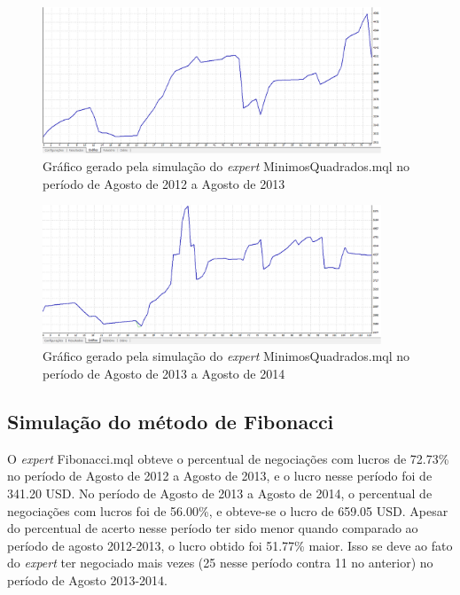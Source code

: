 \begin{figure}[H]
\centering
\includegraphics[width=0.9\textwidth]{figuras/protocoloMinimos3}
\caption{Gráfico gerado pela simulação do \textit{expert} MinimosQuadrados.mql no período de Agosto de 2012 a Agosto de 2013}
\label{protocoloMinimos3}
\end{figure}

\begin{figure}[H]
\centering
\includegraphics[width=0.9\textwidth]{figuras/protocoloMinimos4}
\caption{Gráfico gerado pela simulação do \textit{expert} MinimosQuadrados.mql no período de Agosto de 2013 a Agosto de 2014}
\label{protocoloMinimos4}
\end{figure}

\subsection{Simulação do método de Fibonacci}

O \textit{expert} Fibonacci.mql obteve o percentual de negociações com lucros de 72.73\% no período de Agosto de 2012 a Agosto de 2013, e o  lucro nesse período foi de 341.20 USD.
No período de Agosto de 2013 a Agosto de 2014, o percentual de negociações com lucros foi de 56.00\%,  e obteve-se o lucro de 659.05 USD. Apesar do percentual de acerto nesse período ter sido menor quando comparado ao período de agosto 2012-2013, o lucro obtido foi 51.77\% maior. Isso se deve ao fato do \textit{expert} ter negociado mais vezes (25 nesse período contra 11 no anterior) no período de Agosto 2013-2014.

